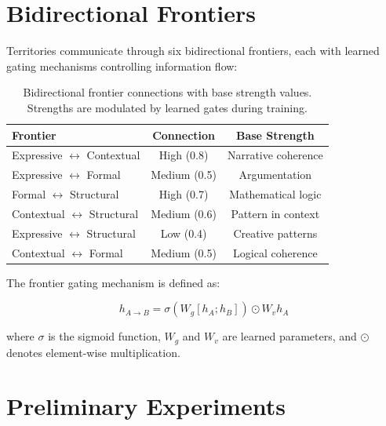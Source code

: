 \documentclass[11pt,a4paper]{article}
\begin{document}
\section{Bidirectional Frontiers}
\label{sec:frontiers}

Territories communicate through six bidirectional frontiers, each with learned gating mechanisms controlling information flow:

\begin{table}[h]
\centering
\begin{tabular}{lcc}
\toprule
\textbf{Frontier} & \textbf{Connection} & \textbf{Base Strength} \\
\midrule
Expressive $\leftrightarrow$ Contextual & High (0.8) & Narrative coherence \\
Expressive $\leftrightarrow$ Formal & Medium (0.5) & Argumentation \\
Formal $\leftrightarrow$ Structural & High (0.7) & Mathematical logic \\
Contextual $\leftrightarrow$ Structural & Medium (0.6) & Pattern in context \\
Expressive $\leftrightarrow$ Structural & Low (0.4) & Creative patterns \\
Contextual $\leftrightarrow$ Formal & Medium (0.5) & Logical coherence \\
\bottomrule
\end{tabular}
\caption{Bidirectional frontier connections with base strength values. Strengths are modulated by learned gates during training.}
\label{tab:frontiers}
\end{table}

The frontier gating mechanism is defined as:

\begin{equation}
    h_{A \rightarrow B} = \sigma(W_g [h_A; h_B]) \odot W_v h_A
\end{equation}

where $\sigma$ is the sigmoid function, $W_g$ and $W_v$ are learned parameters, and $\odot$ denotes element-wise multiplication.

\section{Preliminary Experiments}
\label{sec:experiments}
\end{document}
